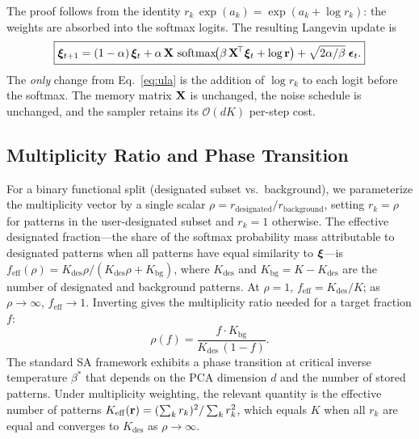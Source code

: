 The proof follows from the identity $r_k\,\exp(a_k) = \exp(a_k + \log r_k)$: the weights are
absorbed into the softmax logits. The resulting Langevin update is
\begin{equation}\label{eq:weighted-ula}
  \boxed{
  \bm{\xi}_{t+1}
    = (1-\alpha)\,\bm{\xi}_{t}
    + \alpha\,\mathbf{X}\,\operatorname{softmax}\!\bigl(\beta\,\mathbf{X}^{\!\top}\bm{\xi}_{t} + \log\mathbf{r}\bigr)
    + \sqrt{2\alpha/\beta}\;\bm{\epsilon}_{t}.}
\end{equation}
The \emph{only} change from Eq.~\eqref{eq:ula} is the addition of $\log r_k$ to each logit
before the softmax. The memory matrix $\mathbf{X}$ is unchanged, the noise schedule is unchanged, and
the sampler retains its $\mathcal{O}(dK)$ per-step cost.

\subsection{Multiplicity Ratio and Phase Transition}\label{sec:phase}

For a binary functional split (designated subset vs.\ background), we parameterize the multiplicity
vector by a single scalar $\rho = r_{\mathrm{designated}}/r_{\mathrm{background}}$, setting
$r_k = \rho$ for patterns in the user-designated subset and $r_k = 1$ otherwise. The effective
designated fraction---the share of the softmax probability mass attributable to designated
patterns when all patterns have equal similarity to $\bm{\xi}$---is
$f_{\mathrm{eff}}(\rho) = K_{\mathrm{des}}\rho/(K_{\mathrm{des}}\rho + K_{\mathrm{bg}})$, where
$K_{\mathrm{des}}$ and $K_{\mathrm{bg}} = K - K_{\mathrm{des}}$ are the number of designated and
background patterns. At $\rho=1$,
$f_{\mathrm{eff}} = K_{\mathrm{des}}/K$; as $\rho \to \infty$, $f_{\mathrm{eff}} \to 1$. Inverting
gives the multiplicity ratio needed for a target fraction $f$:
\begin{equation}\label{eq:rho-inverse}
  \rho(f) = \frac{f \cdot K_{\mathrm{bg}}}{K_{\mathrm{des}}\,(1-f)}.
\end{equation}
The standard SA framework exhibits a phase transition at critical inverse temperature $\beta^{*}$
that depends on the PCA dimension $d$ and the number of stored patterns. Under multiplicity
weighting, the relevant quantity is the effective number of patterns
$K_{\mathrm{eff}}(\mathbf{r}) = (\sum_k r_k)^{2} / \sum_k r_k^{2}$, which equals $K$ when all $r_k$
are equal and converges to $K_{\mathrm{des}}$ as $\rho \to \infty$.

